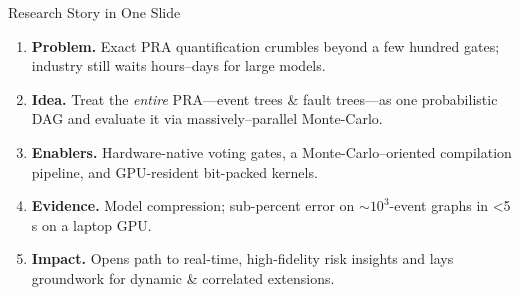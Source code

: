 \begin{frame}[t]{Research Story in One Slide}
  \begin{enumerate}[<+->]
    \item \textbf{Problem.}  Exact PRA quantification crumbles beyond a few hundred gates; industry still waits hours–days for large models.
    \item \textbf{Idea.}  Treat the \emph{entire} PRA—event trees \& fault trees—as one probabilistic DAG and evaluate it via massively–parallel Monte-Carlo.
    \item \textbf{Enablers.}  Hardware-native voting gates, a Monte-Carlo–oriented compilation pipeline, and GPU-resident bit-packed kernels.
    \item \textbf{Evidence.} Model compression; sub-percent error on $\sim10^3$-event graphs in <5 s on a laptop GPU.
    \item \textbf{Impact.}  Opens path to real-time, high-fidelity risk insights and lays groundwork for dynamic \& correlated extensions.
  \end{enumerate}
\end{frame}